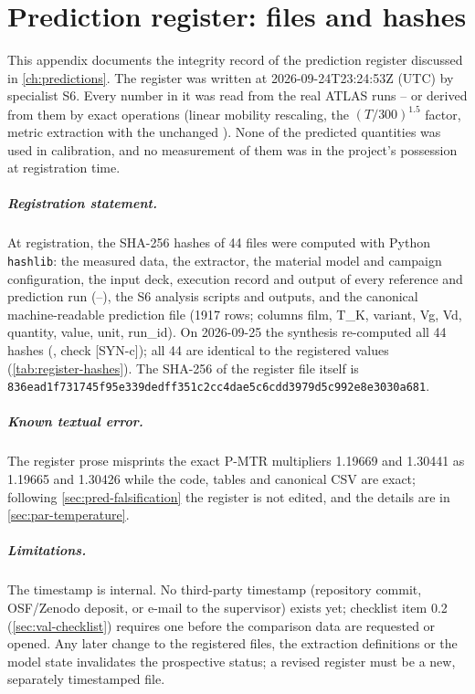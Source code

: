 \chapter{Prediction register: files and hashes}\label{ch:app-register}

This appendix documents the integrity record of the prediction register discussed in \cref{ch:predictions}. The register  was written at 2026-09-24T23:24:53Z (UTC) by specialist S6. Every number in it was read from the real ATLAS runs -- or derived from them by exact operations (linear mobility rescaling, the $(T/300)^{1.5}$ factor, metric extraction with the unchanged ). None of the predicted quantities was used in calibration, and no measurement of them was in the project's possession at registration time.

\paragraph{Registration statement.} At registration, the SHA-256 hashes of 44 files were computed with Python \texttt{hashlib}: the measured data, the extractor, the material model and campaign configuration, the input deck, execution record and output of every reference and prediction run (--), the S6 analysis scripts and outputs, and the canonical machine-readable prediction file  (1917 rows; columns film, T\_K, variant, Vg, Vd, quantity, value, unit, run\_id). On 2026-09-25 the synthesis re-computed all 44 hashes (, check [SYN-c]); all 44 are identical to the registered values (\cref{tab:register-hashes}). The SHA-256 of the register file itself is \texttt{836ead1f731745f95e339dedff351c2cc4dae5c6cdd3979d5c992e8e3030a681}.

\paragraph{Known textual error.} The register prose misprints the exact P-MTR multipliers 1.19669 and 1.30441 as 1.19665 and 1.30426 while the code, tables and canonical CSV are exact; following \cref{sec:pred-falsification} the register is not edited, and the details are in \cref{sec:par-temperature}.

\paragraph{Limitations.} The timestamp is internal. No third-party timestamp (repository commit, OSF/Zenodo deposit, or e-mail to the supervisor) exists yet; checklist item 0.2 (\cref{sec:val-checklist}) requires one before the comparison data are requested or opened. Any later change to the registered files, the extraction definitions or the model state invalidates the prospective status; a revised register must be a new, separately timestamped file.


